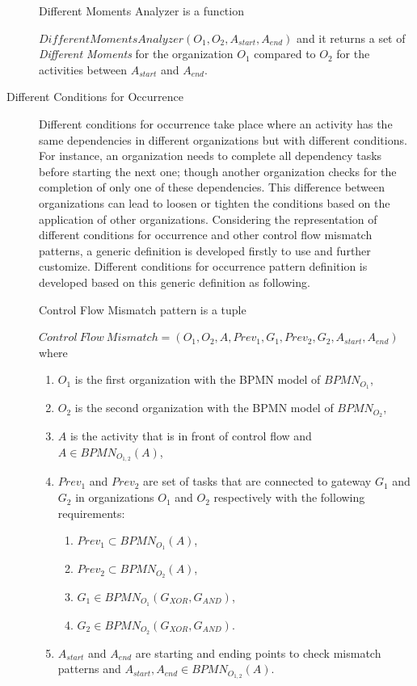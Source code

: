 \begin{description}
		\theoremstyle{definition}
		\begin{definition}
		Different Moments Analyzer is a function 

		$DifferentMomentsAnalyzer(O_{1}, O_{2}, A_{start}, A_{end})$ and it returns a set of \textit{Different Moments} for the organization $O_{1}$ compared to $O_{2}$ for the activities between $A_{start}$ and $A_{end}$.
		\end{definition}

	\item[Different Conditions for Occurrence] Different conditions for occurrence take place where an activity has the same dependencies in different organizations but with different conditions. For instance, an organization needs to complete all dependency tasks before starting the next one; though another organization checks for the completion of only one of these dependencies. This difference between organizations can lead to loosen or tighten the conditions based on the application of other organizations. Considering the representation of different conditions for occurrence and other control flow mismatch patterns, a generic definition is developed firstly to use and further customize. Different conditions for occurrence pattern definition is developed based on this generic definition as following.
		\theoremstyle{definition}
		\begin{definition}
		Control Flow Mismatch pattern is a tuple 

		${Control\ Flow\ Mismatch} = (O_{1}, O_{2}, A, Prev_{1}, G_{1}, Prev_{2}, G_{2}, A_{start}, A_{end}) $ where 
		\begin{enumerate}
		  \item $O_{1}$ is the first organization with the BPMN model of $BPMN_{{O}_{1}}$,
		  \item $O_{2}$ is the second organization with the BPMN model of $BPMN_{{O}_{2}}$,
		  \item $A$ is the activity that is in front of control flow and $A \in BPMN_{{O}_{1,2}}(A)$,
		  \item $Prev_{1}$ and $Prev_{2}$ are set of tasks that are connected to gateway $G_{1}$ and $G_{2}$ in organizations $O_{1}$ and $O_{2}$ respectively with the following requirements:
			  \begin{enumerate}
				  \item $Prev_{1} \subset BPMN_{{O}_{1}}(A)$,
				  \item $Prev_{2} \subset BPMN_{{O}_{2}}(A)$,
				  \item $G_{1} \in BPMN_{{O}_{1}}(G_{XOR}, G_{AND})$,
	  			  \item $G_{2} \in BPMN_{{O}_{2}}(G_{XOR}, G_{AND})$.
			  \end {enumerate}
 		  \item $A_{start}$ and $A_{end}$ are starting and ending points to check mismatch patterns and $A_{start}, A_{end} \in BPMN_{{O}_{1,2}}(A)$. 
		\end{enumerate}
		\end{definition}


\end{description}
